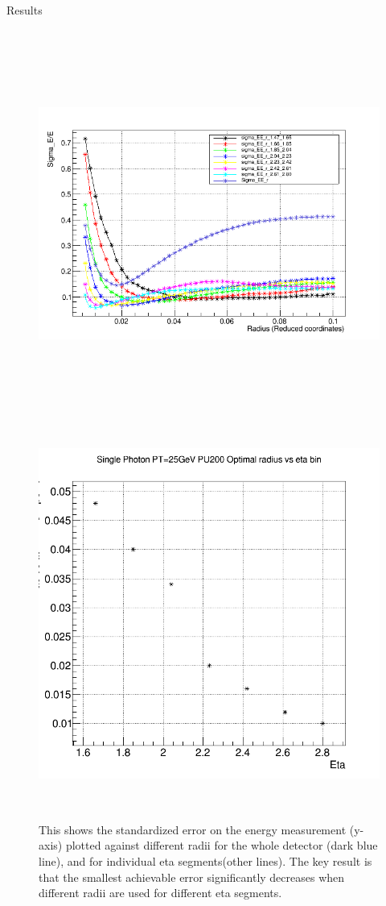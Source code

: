 \documentclass[final,hyperref={pdfpagelabels=false}]{beamer}
\begin{document}
\begin{frame}[t]
\begin{columns}[t]
\begin{column}{.465\textwidth}
\begin{block}{Results}
	\begin{figure}
		\includegraphics[width=0.45\linewidth, height=5in]{SigmaEvsR.png}
		\includegraphics[width=0.45\linewidth, height=5in]{SingleGammaPT25GeVPU200OptimalRadiusbyEta.png}
			\caption{This shows the standardized error on the energy measurement (y-axis) plotted against different radii for the whole detector (dark blue line), and for individual eta segments(other lines). The key result is that the smallest achievable error significantly decreases when different radii are used for different eta segments.}
	\end{figure}


\end{block}
\end{column}
\end{columns}
\end{frame}
\end{document}
